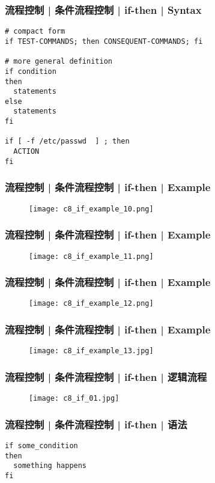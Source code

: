 \begin{frame}[fragile]
  \frametitle{流程控制 | 条件流程控制 | if-then | Syntax}
\begin{lstlisting}
# compact form
if TEST-COMMANDS; then CONSEQUENT-COMMANDS; fi

# more general definition
if condition
then
  statements
else
  statements
fi

if [ -f /etc/passwd  ] ; then
  ACTION
fi
\end{lstlisting}
\end{frame}

\begin{frame}
  \frametitle{流程控制 | 条件流程控制 | if-then | Example}
  \begin{figure}
    \centering
    \texttt{[image: c8\_if\_example\_10.png]}
  \end{figure}
\end{frame}

\begin{frame}
  \frametitle{流程控制 | 条件流程控制 | if-then | Example}
  \begin{figure}
    \centering
    \texttt{[image: c8\_if\_example\_11.png]}
  \end{figure}
\end{frame}

\begin{frame}
  \frametitle{流程控制 | 条件流程控制 | if-then | Example}
  \begin{figure}
    \centering
    \texttt{[image: c8\_if\_example\_12.png]}
  \end{figure}
\end{frame}

\begin{frame}
  \frametitle{流程控制 | 条件流程控制 | if-then | Example}
  \begin{figure}
    \centering
    \texttt{[image: c8\_if\_example\_13.jpg]}
  \end{figure}
\end{frame}

\begin{frame}
  \frametitle{流程控制 | 条件流程控制 | if-then | 逻辑流程}
  \begin{figure}
    \centering
    \texttt{[image: c8\_if\_01.jpg]}
  \end{figure}
\end{frame}

\begin{frame}[fragile]
  \frametitle{流程控制 | 条件流程控制 | if-then | \alert{语法}}
\begin{lstlisting}
if some_condition
then
  something happens
fi
\end{lstlisting}
\end{frame}

